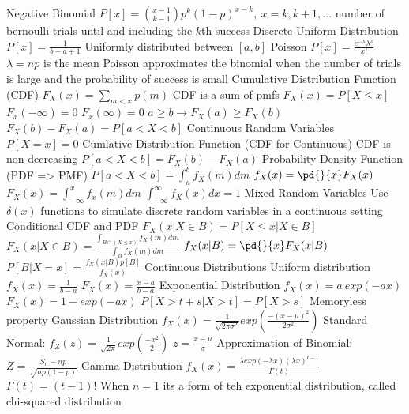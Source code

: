 \documentclass[14pt]{extarticle}
\begin{document}
\begin{outline}
			\2	Negative Binomial
				\3	$P[x] = \binom{x-1}{k-1}p^k(1-p)^{x-k},~x=k,k+1,...$
				\3	number of bernoulli trials until and including the $k$th success
			\2	Discrete Uniform Distribution
				\3	$P[x] = \frac{1}{b - a + 1}$
				\3	Uniformly distributed between $[a,b]$
			\2	Poisson
				\3	$P[x] = \frac{e^{-\lambda}\lambda^x}{x!}$
				\3	$\lambda = np$ is the mean
				\3	Poisson approximates the binomial when the number of trials is large
						and the probability of success is small
		\1	Cumulative Distribution Function (CDF)
			\2	$F_X(x) = \sum_{m < x}p(m)$
				\3	CDF is a sum of pmfs
			\2	$F_X(x) = P[X \le x]$
			\2	$F_x(-\infty) = 0$
			\2	$F_x(\infty) = 0$
			\2	$a \ge b \rightarrow F_X(a) \ge F_X(b)$
			\2	$F_X(b) - F_X(a) = P[a < X < b]$
		\1	Continuous Random Variables
			\2	$P[X = x] = 0$
			\2	Cumlative Distribution Function (CDF for Continuous)
				\3	CDF is non-decreasing
				\3	$P[a < X < b] = F_X(b) - F_X(a)$
			\2	Probability Density Function (PDF => PMF)
				\3 $P[a < X < b] = \int_a^b f_X(m) dm$
				\3	$f_X(x) = \pd{}{x}F_X(x)$
				\3	$F_X(x) = \int_{-\infty}^x f_x(m)dm$
				\3	$\int_{-\infty}^{\infty} f_X(x) dx = 1$
		\1	Mixed Random Variables
			\2	Use $\delta(x)$ functions to simulate discrete random variables in a
					continuous setting
		\1	Conditional CDF and PDF
			\2	$F_X(x | X \in B) = P[X \le x | X \in B]$
			\2	$F_X(x | X \in B) = \frac{\int_{B \cap (X \le x)}f_X(m) dm}{\int_B f_X(m) dm}$
			\2	$f_X(x | B) = \pd{}{x}F_X(x | B)$
			\2	$P[B | X = x] = \frac{f_X(x | B)p[B]}{f_X(x)}$
		\1	Continuous Distributions
			\2	Uniform distribution
				\3	$f_X(x) = \frac{1}{b-a}$
				\3	$F_X(x) = \frac{x - a}{b-a}$
			\2	Exponential Distribution
				\3	$f_X(x) = a~exp(-ax)$
				\3	$F_X(x) = 1 - exp(-ax)$
				\3	$P[X > t + s | X > t] = P[X > s]$
					\4	Memoryless property
			\2	Gaussian Distribution
				\3	$f_X(x) = \frac{1}{\sqrt{2\pi \sigma^2}}exp(\frac{-(x - \mu)^2}{2\sigma^2})$
				\3	Standard Normal:	$f_Z(z) = \frac{1}{\sqrt{2\pi}}exp(\frac{-x^2}{2})$
					\4	$z = \frac{x - \mu}{\sigma}$
					\4	Approximation of Binomial:	$Z = \frac{S_n - np}{\sqrt{np(1-p)}}$
			\2	Gamma Distribution
				\3	$f_X(x) = \frac{\lambda exp(-\lambda x) (\lambda x)^{t-1}}{\Gamma (t)}$
					\4	$\Gamma(t) = (t-1)!$
					\4	When $n = 1$ its a form of teh exponential distribution, called chi-squared distribution





	\end{outline}
\end{document}
